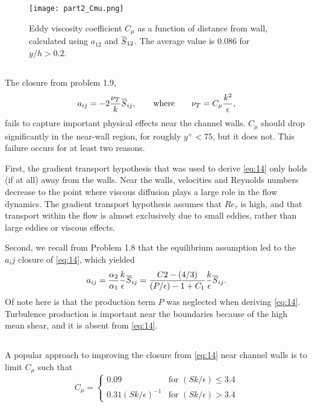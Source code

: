 \documentclass[11pt]{article}
\begin{document}
\begin{figure}[p]
\centering
\texttt{[image: part2\_Cmu.png]}
\vspace{6pt}
\caption{Eddy viscosity coefficient $C_\mu$ as a function of distance from wall, calculated using $a_{12}$ and $\overline{S}_{12}$. The average value is 0.086 for $y/h > 0.2$.}
\label{fig:part2_Cmu}
\end{figure}

\subsection{}

The closure from problem 1.9,
\begin{equation}
a_{ij} =
-2 \frac{\nu_T}{k} \overline{S}_{ij}
,
\qquad
\text{where}
\qquad
\nu_T =
C_\mu \frac{k^2}{\epsilon}
,
\label{eq:14}
\end{equation}
fails to capture important physical effects near the channel walls. $C_\mu$ should drop significantly in the near-wall region, for roughly $y^+ < 75$, but it does not. This failure occurs for at least two reasons.

First, the gradient transport hypothesis that was used to derive \eqref{eq:14} only holds (if at all) away from the walls. Near the walls, velocities and Reynolds numbers decrease to the point where viscous diffusion plays a large role in the flow dynamics. The gradient transport hypothesis assumes that $Re_\tau$ is high, and that transport within the flow is almost exclusively due to small eddies, rather than large eddies or viscous effects.

Second, we recall from Problem 1.8 that the equilibrium assumption led to the $a_ij$ closure of \eqref{eq:14}, which yielded
\begin{equation}
a_{ij} =
\frac{\alpha_2}{\alpha_1} \frac{k}{\epsilon} \overline{S}_{ij} =
\frac{C2-(4/3)}{(P/\epsilon)-1+C_1} \frac{k}{\epsilon} \overline{S}_{ij}
.
\end{equation}
Of note here is that the production term $P$ was neglected when deriving \eqref{eq:14}. Turbulence production is important near the boundaries because of the high mean shear, and it is absent from \eqref{eq:14}.

\subsection{}

A popular approach to improving the closure from \eqref{eq:14} near channel walls is to limit $C_\mu$ such that
\begin{equation}
C_\mu =
\begin{cases}
0.09 &\text{for $(Sk/\epsilon) \le 3.4$} \\
0.31(Sk/\epsilon)^{-1} &\text{for $(Sk/\epsilon) > 3.4$}
\end{cases}
\end{equation}
\end{document}
